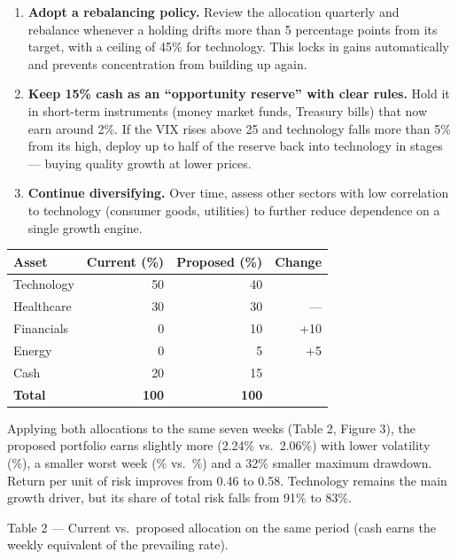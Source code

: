 \documentclass[11pt]{article}
\begin{document}
\begin{enumerate}[leftmargin=1.5em, itemsep=3pt]
  \item \textbf{Adopt a rebalancing policy.} Review the allocation quarterly
  and rebalance whenever a holding drifts more than 5 percentage points from
  its target, with a ceiling of 45\% for technology. This locks in gains
  automatically and prevents concentration from building up again.
  \item \textbf{Keep 15\% cash as an ``opportunity reserve'' with clear
  rules.} Hold it in short-term instruments (money market funds, Treasury
  bills) that now earn around 2\%. If the VIX rises above 25 and technology
  falls more than 5\% from its high, deploy up to half of the reserve back into
  technology in stages --- buying quality growth at lower prices.
  \item \textbf{Continue diversifying.} Over time, assess other sectors with
  low correlation to technology (consumer goods, utilities) to further reduce
  dependence on a single growth engine.
\end{enumerate}

\begin{center}
\begin{tabular}{@{}lrrr@{}}
\toprule
Asset & Current (\%) & Proposed (\%) & Change \\
\midrule
Technology & 50 & 40 & \textminus10 \\
Healthcare & 30 & 30 & --- \\
Financials & 0  & 10 & +10 \\
Energy     & 0  & 5  & +5 \\
Cash       & 20 & 15 & \textminus5 \\
\midrule
\textbf{Total} & \textbf{100} & \textbf{100} & \\
\bottomrule
\end{tabular}
\end{center}

Applying both allocations to the same seven weeks (Table 2, Figure 3), the
proposed portfolio earns slightly more (2.24\% vs.\ 2.06\%) with lower
volatility (\%), a smaller worst week (\% vs.\ \%) and a
32\% smaller maximum drawdown. Return per unit of risk improves from 0.46 to
0.58. Technology remains the main growth driver, but its share of total risk
falls from 91\% to 83\%.

\begin{center}
  \small\par\smallskip
  {\color{gray}Table 2 --- Current vs.\ proposed allocation on the same period
  (cash earns the weekly equivalent of the prevailing rate).}
\end{center}
\end{document}
